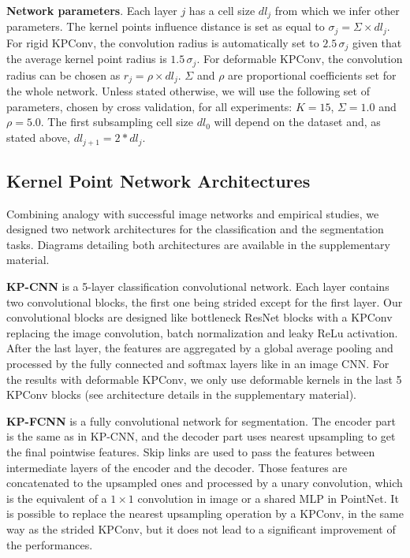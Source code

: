 \documentclass[10pt,twocolumn,letterpaper]{article}
\begin{document}
\noindent
\textbf{Network parameters}. Each layer $j$ has a cell size ${dl}_j$ from which we infer other parameters. The kernel points influence distance is set as equal to $\sigma_j = \Sigma \times {dl}_j$. For rigid KPConv, the convolution radius is automatically set to $2.5 \, \sigma_j$ given that the average kernel point radius is $1.5 \, \sigma_j$. For deformable KPConv, the convolution radius can be chosen as $r_j = \rho \times {dl}_j$. $\Sigma$ and $\rho$ are proportional coefficients set for the whole network. Unless stated otherwise, we will use the following set of parameters, chosen by cross validation, for all experiments: $K=15$, $\Sigma = 1.0$ and $\rho = 5.0$. The first subsampling cell size ${dl}_0$ will depend on the dataset and, as stated above, ${dl}_{j+1} = 2 * {dl}_j$.

\subsection{Kernel Point Network Architectures}

Combining analogy with successful image networks and empirical studies, we designed two network architectures for the classification and the segmentation tasks. Diagrams detailing both architectures are available in the supplementary material.

\noindent
\textbf{KP-CNN} is a 5-layer classification convolutional network. Each layer contains two convolutional blocks, the first one being strided except for the first layer. Our convolutional blocks are designed like bottleneck ResNet blocks \cite{he2016deep} with a KPConv replacing the image convolution, batch normalization and leaky ReLu activation. After the last layer, the features are aggregated by a global average pooling and processed by the fully connected and softmax layers like in an image CNN. For the results with deformable KPConv, we only use deformable kernels in the last 5 KPConv blocks (see architecture details in the supplementary material).

\noindent
\textbf{KP-FCNN} is a fully convolutional network for segmentation. The encoder part is the same as in KP-CNN, and the decoder part uses nearest upsampling to get the final pointwise features. Skip links are used to pass the features between intermediate layers of the encoder and the decoder. Those features are concatenated to the upsampled ones and processed by a unary convolution, which is the equivalent of a $1 \times 1$ convolution in image or a shared MLP in PointNet. It is possible to replace the nearest upsampling operation by a KPConv, in the same way as the strided KPConv, but it does not lead to a significant improvement of the performances.
\end{document}
